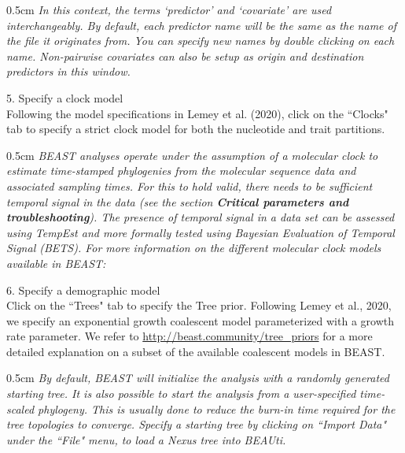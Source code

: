 \documentclass{article}
\newcommand{\ann}[1]{
\begin{adjustwidth}{0.5cm}{}
\it{#1}\\
\end{adjustwidth}}
\newcommand{\code}[1]{
{\upshape\ttfamily{#1}}}
\begin{document}
\ann{In this context, the terms `predictor' and `covariate' are used interchangeably.
By default, each predictor name will be the same as the name of the file it originates from. %
You can specify new names by double clicking on each name.
Non-pairwise covariates can also be setup as origin and destination predictors in this window.}

5. Specify a clock model\\

Following the model specifications in Lemey et al. (2020), %
click on the ``Clocks" tab to specify a strict clock model for both the nucleotide and trait partitions.\\
\ann{BEAST analyses operate under the assumption of a molecular clock to estimate time-stamped phylogenies from the molecular sequence data and associated sampling times.
For this to hold valid, there needs to be sufficient temporal signal in the data (see the section \textbf{Critical parameters and troubleshooting}).
The presence of temporal signal in a data set can be assessed using TempEst and more formally tested using Bayesian Evaluation of Temporal Signal (BETS). %
For more information on the different molecular clock models available in BEAST: \code{http://beast.community/clocks}} %

6. Specify a demographic model\\

Click on the ``Trees" tab to specify the Tree prior. Following Lemey et al., 2020, %
we specify an exponential growth coalescent model parameterized with a growth rate parameter.
We refer to \url{http://beast.community/tree_priors} for a more detailed explanation on a subset of the available coalescent models in BEAST. \\

\ann{By default, BEAST will initialize the analysis with a randomly generated starting tree. It is also possible to start the analysis from a user-specified time-scaled phylogeny. This is usually done to reduce the burn-in time required for the tree topologies to converge. Specify a starting tree by clicking on ``Import Data" under the ``File" menu, to load a Nexus tree into BEAUti.}
\end{document}
